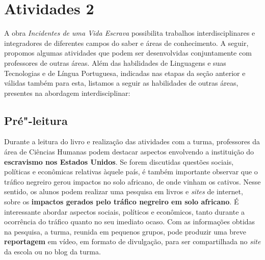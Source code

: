 \documentclass[12pt]{extarticle}
\begin{document}
\section{Atividades 2}


A obra \emph{Incidentes de uma Vida Escrava} possibilita trabalhos
interdisciplinares e integradores de diferentes campos do saber e áreas
de conhecimento. A seguir, propomos algumas atividades que podem ser
desenvolvidas conjuntamente com professores de outras áreas. Além das
habilidades de Linguagens e suas Tecnologias e de Língua Portuguesa,
indicadas nas etapas da seção anterior e válidas também para esta,
listamos a seguir as habilidades de outras áreas, presentes na abordagem
interdisciplinar:

\subsection{Pré"-leitura}

Durante a leitura do livro e realização das atividades com a
turma, professores da área de Ciências Humanas podem destacar aspectos
envolvendo a instituição do \textbf{escravismo nos Estados Unidos}. Se
forem discutidas questões sociais, políticas e econômicas relativas
àquele país, é também importante observar que o tráfico negreiro gerou
impactos no solo africano, de onde vinham os cativos. Nesse sentido, os
alunos podem realizar uma pesquisa em livros e \emph{sites} de internet,
sobre os \textbf{impactos gerados pelo tráfico negreiro em solo
africano}. É interessante abordar aspectos sociais, políticos e
econômicos, tanto durante a ocorrência do tráfico quanto no seu imediato
ocaso. Com as informações obtidas na pesquisa, a turma, reunida em
pequenos grupos, pode produzir uma breve \textbf{reportagem} em vídeo,
em formato de divulgação, para ser compartilhada no \emph{site} da
escola ou no blog da turma.
\end{document}
